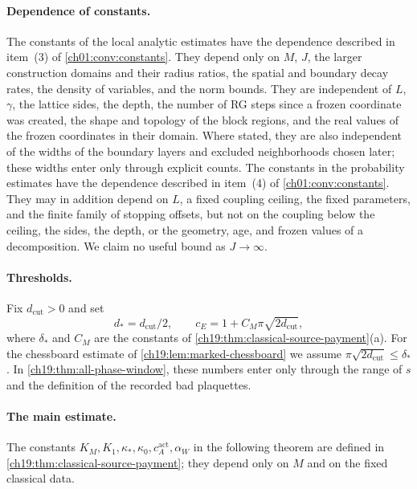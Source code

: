 \paragraph{Dependence of constants.}
The constants of the local analytic estimates have the dependence described in item~(3) of \cref{ch01:conv:constants}. They depend only on $M$, $J$, the larger construction domains and their radius ratios, the spatial and boundary decay rates, the density of variables, and the norm bounds. They are independent of $L$, $\gamma$, the lattice sides, the depth, the number of RG steps since a frozen coordinate was created, the shape and topology of the block regions, and the real values of the frozen coordinates in their domain. Where stated, they are also independent of the widths of the boundary layers and excluded neighborhoods chosen later; these widths enter only through explicit counts. The constants in the probability estimates have the dependence described in item~(4) of \cref{ch01:conv:constants}. They may in addition depend on $L$, a fixed coupling ceiling, the fixed parameters, and the finite family of stopping offsets, but not on the coupling below the ceiling, the sides, the depth, or the geometry, age, and frozen values of a decomposition. We claim no useful bound as $J\to\infty$.

\paragraph{Thresholds.}
Fix $d_{\mathrm{cut}}>0$ and set
\[
 d_*=d_{\mathrm{cut}}/2,\qquad c_E=1+C_M\pi\sqrt{2d_{\mathrm{cut}}},
\]
where $\delta_*$ and $C_M$ are the constants of \cref{ch19:thm:classical-source-payment}(a). For the chessboard estimate of \cref{ch19:lem:marked-chessboard} we assume $\pi\sqrt{2d_{\mathrm{cut}}}\le\delta_*$. In \cref{ch19:thm:all-phase-window}, these numbers enter only through the range of $s$ and the definition of the recorded bad plaquettes.

\paragraph{The main estimate.}
The constants $K_M,K_1,\kappa_*,\kappa_0,c_A^{\mathrm{act}},\alpha_W$ in the following theorem are defined in \cref{ch19:thm:classical-source-payment}; they depend only on $M$ and on the fixed classical data.

